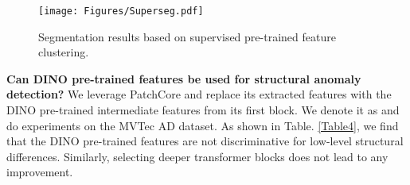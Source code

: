 \documentclass[final,5p,times,twocolumn]{elsarticle}
\begin{document}
\begin{figure}
\centering
		\texttt{[image: Figures/Superseg.pdf]}\caption{Segmentation results based on supervised pre-trained feature clustering.}
	\label{FIG:10}
\end{figure}

\textbf{Can DINO pre-trained features be used for structural anomaly detection?} We leverage PatchCore and replace its extracted features with the DINO pre-trained intermediate features from its first block. We denote it as  and do experiments on the MVTec AD dataset. As shown in Table. \ref{Table4}, we find that the DINO pre-trained features are not discriminative for low-level structural differences. Similarly, selecting deeper transformer blocks does not lead to any improvement.  

\begin{table}[]
\caption{Quantitative comparisons of image-level detection results for Patchcore with different pre-trained features on the MVTec AD dataset. (AUROC\%)}
\label{Table4}
\centering
{}
\end{table}
\end{document}
